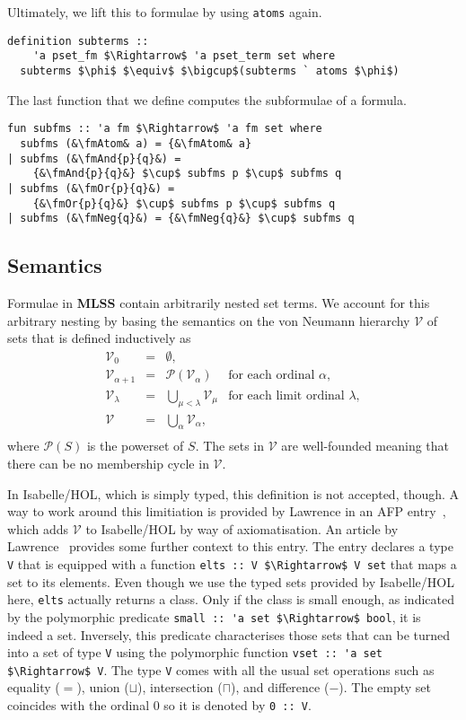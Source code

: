 \documentclass[sigplan,10pt,anonymous,review]{acmart}
\newcommand{\MLSS}{\textbf{MLSS}}
\newcommand{\fmAnd}[2]{#1 $\boldsymbol{\land}$ #2}
\newcommand{\fmOr}[2]{#1 $\boldsymbol{\lor}$ #2}
\newcommand{\fmNeg}[1]{$\boldsymbol{\neg}$ #1}
\newcommand{\fmAtom}{\textbf{A}}
\begin{document}
Ultimately, we lift this to formulae by using \lstinline!atoms! again.
\begin{lstlisting}
definition subterms ::
    'a pset_fm $\Rightarrow$ 'a pset_term set where
  subterms $\phi$ $\equiv$ $\bigcup$(subterms ` atoms $\phi$)
\end{lstlisting}
The last function that we define computes the subformulae of a formula.
\begin{lstlisting}
fun subfms :: 'a fm $\Rightarrow$ 'a fm set where
  subfms (&\fmAtom& a) = {&\fmAtom& a}
| subfms (&\fmAnd{p}{q}&) =
    {&\fmAnd{p}{q}&} $\cup$ subfms p $\cup$ subfms q
| subfms (&\fmOr{p}{q}&) =
    {&\fmOr{p}{q}&} $\cup$ subfms p $\cup$ subfms q
| subfms (&\fmNeg{q}&) = {&\fmNeg{q}&} $\cup$ subfms q
\end{lstlisting}

\subsection{Semantics}
Formulae in \MLSS{} contain arbitrarily nested set terms.
We account for this arbitrary nesting by basing the semantics on the von Neumann hierarchy $\mathcal{V}$ of sets that is defined inductively as
  \[
    \begin{array}{rclr}
      \mathcal{V}_0 & = & \emptyset, \\
      \mathcal{V}_{\alpha + 1} & = & \mathcal{P}(\mathcal{V}_\alpha) & \text{for each ordinal $\alpha$}, \\
      \mathcal{V}_{\lambda} & = & \bigcup_{\mu < \lambda} \mathcal{V}_\mu & \text{for each limit ordinal $\lambda$}, \\
      \mathcal{V} & = & \bigcup_\alpha \mathcal{V}_\alpha, \\
    \end{array}
  \]
where $\mathcal{P}(S)$ is the powerset of $S$.
The sets in $\mathcal{V}$ are well-founded meaning that there can be no membership cycle in $\mathcal{V}$.

In Isabelle/HOL, which is simply typed, this definition is not accepted, though.
A way to work around this limitiation is provided by Lawrence in an AFP entry~\cite{zfc_in_hol_afp}, which adds $\mathcal{V}$ to Isabelle/HOL by way of axiomatisation.
An article by Lawrence~\cite{zfc_in_hol} provides some further context to this entry.
The entry declares a type \lstinline!V! that is equipped with a function \lstinline!elts :: V $\Rightarrow$ V set! that maps a set to its elements.
Even though we use the typed sets provided by Isabelle/HOL here, \lstinline!elts! actually returns a class.
Only if the class is small enough, as indicated by the polymorphic predicate \lstinline!small :: 'a set $\Rightarrow$ bool!, it is indeed a set.
Inversely, this predicate characterises those sets that can be turned into a set of type \lstinline!V! using the polymorphic function \lstinline!vset :: 'a set $\Rightarrow$ V!.
The type \lstinline!V! comes with all the usual set operations such as equality ($=$), union ($\sqcup$), intersection ($\sqcap$), and difference ($-$).
The empty set coincides with the ordinal $0$ so it is denoted by \lstinline!0 :: V!.
\end{document}
